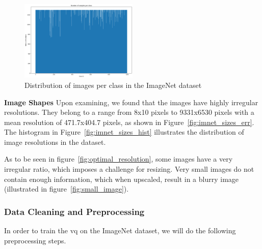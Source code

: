 \begin{figure}[ht]
    \centering
    \includegraphics[width=0.5\textwidth]{../../sample_images/imagenet_dist}
    \caption{Distribution of images per class in the ImageNet dataset}
    \label{fig:imnet_dist}
\end{figure}

\textbf{Image Shapes}
Upon examining, we found that the images have highly irregular resolutions.
They belong to a range from 8x10 pixels to 9331x6530 pixels with a mean resolution of 471.7x404.7 pixels, as shown in
Figure~\ref{fig:imnet_sizes_err}.
The histogram in Figure~\ref{fig:imnet_sizes_hist} illustrates the distribution of image resolutions in the dataset.

As to be seen in figure~\ref{fig:optimal_resolution}, some images have a very irregular ratio, which imposes a challenge
for resizing.
Very small images do not contain enough information, which when upscaled, result in a blurry image (illustrated in
figure~\ref{fig:small_image}).

\subsubsection{Data Cleaning and Preprocessing}
In order to train the \ac{vq} on the ImageNet dataset, we will do the following preprocessing steps.

